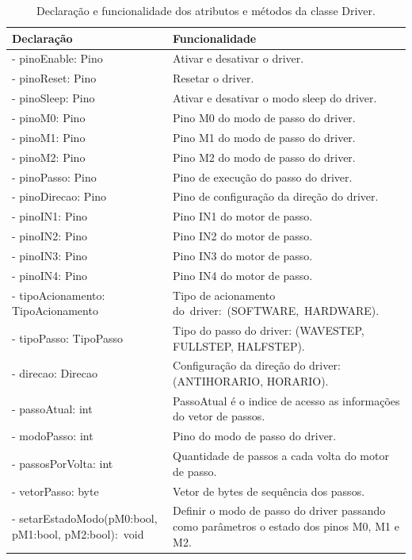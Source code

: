 \begin{table}[H]
    \footnotesize
    \centering
    \caption{Declaração e funcionalidade dos atributos e métodos da classe Driver.}
    \begin{tabular}{p{8cm}p{6cm}}
        \hline
        \textbf{Declaração} & \textbf{Funcionalidade}\\
        \hline
        - pinoEnable: Pino & Ativar e desativar o driver.\\
        - pinoReset: Pino & Resetar o driver.\\
        - pinoSleep: Pino & Ativar e desativar o modo sleep do driver.\\
        - pinoM0: Pino & Pino M0 do modo de passo do driver.\\
        - pinoM1: Pino & Pino M1 do modo de passo do driver.\\
        - pinoM2: Pino & Pino M2 do modo de passo do driver.\\
        - pinoPasso: Pino & Pino de execução do passo do driver.\\
        - pinoDirecao: Pino & Pino de configuração da direção do driver.\\
        - pinoIN1: Pino & Pino IN1 do motor de passo.\\
        - pinoIN2: Pino & Pino IN2 do motor de passo.\\
        - pinoIN3: Pino & Pino IN3 do motor de passo.\\
        - pinoIN4: Pino & Pino IN4 do motor de passo.\\
        - tipoAcionamento: TipoAcionamento & Tipo de acionamento do~driver:~(SOFTWARE,~HARDWARE).\\
        - tipoPasso: TipoPasso & Tipo do passo do driver: (WAVESTEP, FULLSTEP, HALFSTEP).\\
        - direcao: Direcao & Configuração da direção do driver: (ANTIHORARIO, HORARIO).\\
        - passoAtual: int & PassoAtual é o indice de acesso as informações do vetor de passos.\\
        - modoPasso: int & Pino do modo de passo do driver.\\
        - passosPorVolta: int & Quantidade de passos a cada volta do motor de passo.\\
        - vetorPasso: byte & Vetor de bytes de sequência dos passos.\\
        - setarEstadoModo(pM0:bool, pM1:bool, pM2:bool):~void & Definir o modo de passo do driver passando como parâmetros o estado dos pinos M0, M1 e M2.\\

\end{tabular}
\end{table}
